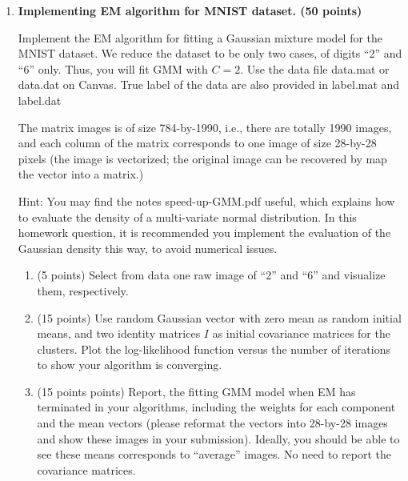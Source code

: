 \documentclass[twoside,10pt]{article}
\begin{document}
\begin{enumerate}

\item {\bf Implementing EM algorithm for MNIST dataset. (50 points)} 

 Implement the EM algorithm for fitting a Gaussian mixture model for the MNIST dataset. We reduce the dataset to be only two cases, of digits ``2'' and ``6'' only. Thus, you will fit GMM with $C = 2$. Use the data file \textsf{data.mat} or \textsf{data.dat} on Canvas. True label of the data are also provided in \textsf{label.mat} and \textsf{label.dat}

The matrix \textsf{images} is of size 784-by-1990, i.e., there are totally 1990 images, and each column of the matrix corresponds to one image of size 28-by-28 pixels (the image is vectorized; the original image can be recovered by map the vector into a matrix.) %

Hint: You may find the notes \textsf{speed-up-GMM.pdf} useful, which explains how to evaluate the density of a multi-variate normal distribution. In this homework question, it is recommended you implement the evaluation of the Gaussian density this way, to avoid numerical issues.

\begin{enumerate}

\item (5 points) Select from data one raw image of ``2'' and ``6'' and visualize them, respectively. 

\item (15 points) Use random Gaussian vector with zero mean as random initial means, and two identity matrices $I$ as initial covariance matrices for the clusters. Plot the log-likelihood function versus the number of iterations to show your algorithm is converging.

\item (15 points points) Report, the fitting GMM model when EM has terminated in your algorithms, including the weights for each component and the mean vectors (please reformat the vectors into 28-by-28 images and show these images in your submission). Ideally, you should be able to see these means corresponds to ``average'' images.  No need to report the covariance matrices. 


\end{enumerate}
\end{enumerate}
\end{document}
